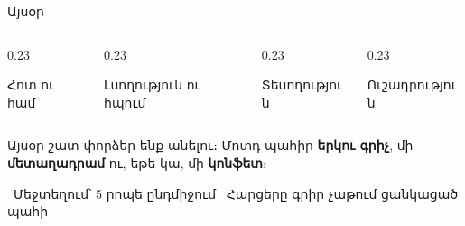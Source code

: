 \begin{frame}{Այսօր}
  \begin{columns}[T]
    \begin{column}{0.23\textwidth}
      \begin{card}[colback=peach!45!cream]
        \centering{}\par\smallskip
        {\blackfont Հոտ ու համ}
      \end{card}
    \end{column}
    \begin{column}{0.23\textwidth}
      \begin{card}[colback=mint!45!cream]
        \centering{}\par\smallskip
        {\blackfont Լսողություն ու հպում}
      \end{card}
    \end{column}
    \begin{column}{0.23\textwidth}
      \begin{card}[colback=lavender!45!cream]
        \centering{}\par\smallskip
        {\blackfont Տեսողություն}
      \end{card}
    \end{column}
    \begin{column}{0.23\textwidth}
      \begin{card}[colback=butter!45!cream]
        \centering{}\par\smallskip
        {\blackfont Ուշադրություն}
      \end{card}
    \end{column}
  \end{columns}
  \vspace{3mm}
  \begin{tryit}
    Այսօր շատ փորձեր ենք անելու։ Մոտդ պահիր \textbf{երկու գրիչ}, մի \textbf{մետաղադրամ} ու, եթե կա, մի \textbf{կոնֆետ}։
  \end{tryit}
  \vspace{2mm}
  {\centering\small {}\ Մեջտեղում՝ 5 րոպե ընդմիջում \qquad {}\ Հարցերը գրիր չաթում ցանկացած պահի\par}
\end{frame}
